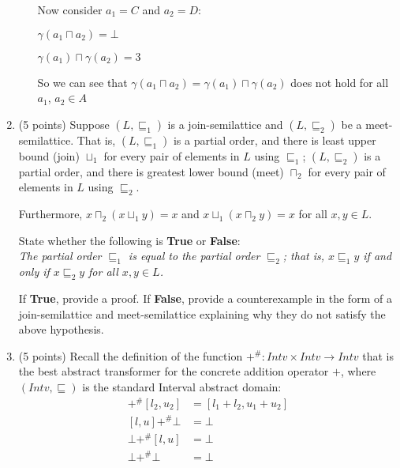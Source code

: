 \documentclass[12pt]{article}
\begin{document}
\begin{enumerate}
\begin{enumerate}
\begin{mdframed}
Now consider $a_1 = C$ and $a_2 = D$:

$\gamma ( a_1 \sqcap a_2 ) = \bot$

$\gamma(a_1) \sqcap \gamma(a_2) = 3$

So we can see that $\gamma ( a_1 \sqcap a_2 ) = \gamma(a_1) \sqcap \gamma(a_2)$ does not hold for all $a_1$, $a_2 \in A$

\end{mdframed}


\end{enumerate}
\newpage

\item (5 points) Suppose $(L, \sqsubseteq_1)$ is a join-semilattice and $(L,
\sqsubseteq_2)$ be a meet-semilattice. 
%
That is, $(L, \sqsubseteq_1)$ is a partial order, and there is least upper bound
(join) $\sqcup_1$ for every pair of elements in $L$ using $\sqsubseteq_1$; 
$(L, \sqsubseteq_2)$ is a partial order, and there is greatest
lower bound (meet) $\sqcap_2$ for every pair of elements in $L$ using
$\sqsubseteq_2$. 

Furthermore, $x \sqcap_2 (x \sqcup_1 y) = x$ and $x \sqcup_1 (x \sqcap_2 y) = x$
for all $x, y \in L$. 

State whether the following is \textbf{True} or \textbf{False}:\\
\emph{The partial order $\sqsubseteq_1$ is equal to the partial order $\sqsubseteq_2$; 
that is, $x \sqsubseteq_1 y$ if and only if $x \sqsubseteq_2 y$ for all $x, y \in L$.}

If \textbf{True}, provide a proof. 
If \textbf{False}, provide a counterexample in the form 
of a join-semilattice and meet-semilattice explaining why they do not satisfy 
the above hypothesis.
\begin{mdframed}
  \vspace{2em}
  \end{mdframed}
\emph{}


\item (5 points)
Recall the definition of the function $+^{\#} \colon Intv \times Intv \to Intv$
that is the best abstract transformer for the concrete addition operator $+$,
where $(Intv, \sqsubseteq)$ is the standard Interval abstract domain:
\begin{align*}
  [l_1, u_1] +^{\#} [l_2, u_2] &= [l_1 + l_2, u_1 + u_2] \\
  [l, u] +^{\#} \bot &= \bot \\ 
  \bot +^{\#} [l, u] &= \bot \\ 
  \bot +^{\#} \bot &= \bot 
\end{align*}


\end{enumerate}
\end{document}
